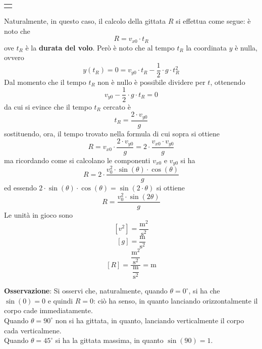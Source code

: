 \documentclass[a4paper]{extarticle}
\begin{document}
\vspace{2em}
\noindent
{}
\begin{tabularx}{\textwidth}{P}
  {
      \centering
  }
\end{tabularx}

\vspace{1em}
\noindent
Naturalmente, in questo caso, il calcolo della gittata $R$ si effettua come segue: è noto che
\[R = v_{x0} \cdot t_R\]
ove $t_R$ è la \textbf{durata del volo}. Però è noto che al tempo $t_R$ la coordinata $y$ è nulla, ovvero
\[y(t_R) = 0 = v_{y0} \cdot t_R - \frac{1}{2} \cdot g \cdot t_R^2\]
Dal momento che il tempo $t_R$ non è nullo è possibile dividere per $t$, ottenendo
\[v_{y0} - \frac{1}{2} \cdot g \cdot t_R = 0\]
da cui si evince che il tempo $t_R$ cercato è
\[t_R = \frac{2 \cdot v_{y0}}{g}\]
sostituendo, ora, il tempo trovato nella formula di cui sopra si ottiene
\[R = v_{x0} \cdot \frac{2 \cdot v_{y0}}{g} = 2 \cdot \frac{v_{x0} \cdot v_{y0}}{g}\]
ma ricordando come si calcolano le componenti $v_{x0}$ e $v_{y0}$ si ha
\[R = 2 \cdot \frac{v_0^2 \cdot \sin(\theta) \cdot \cos(\theta)}{g}\]
ed essendo $2 \cdot \sin(\theta) \cdot \cos(\theta) = \sin(2 \cdot \theta)$ si ottiene
\[\boxed{R = \frac{v_0^2 \cdot \sin(2\theta)}{g}}\]
Le unità in gioco sono
\[[v^2] = \frac{\text{m}^2}{\text{s}^2}\]
\[[g] = \frac{\text{m}}{\text{s}^2}\]
\[[R] = \frac{\dfrac{\text{m}^2}{\text{s}^2}}{\dfrac{\text{m}}{\text{s}^2}} = \text{m}\]

\vspace{1em}
\noindent
\textbf{Osservazione}: Si osservi che, naturalmente, quando $\theta=0^\circ$, si ha che $\sin(0) = 0$ e quindi $R=0$: ciò ha senso, in quanto lanciando orizzontalmente il corpo cade immediatamente.\\
Quando $\theta=90^\circ$ non si ha gittata, in quanto, lanciando verticalmente il corpo cada verticalmene.\\
Quando $\theta=45^\circ$ si ha la gittata massima, in quanto $\sin(90)=1$.
\end{document}

